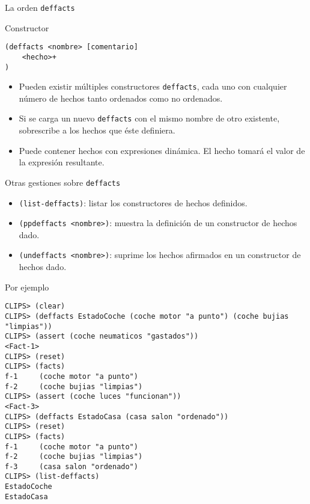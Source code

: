 \documentclass[usenames,dvipsnames,aspectratio=169]{beamer}
\begin{document}
\begin{frame}[fragile]{La orden \texttt{deffacts}}
	\begin{block}{Constructor}
		\begin{verbatim}
(deffacts <nombre> [comentario]
    <hecho>+
)
		\end{verbatim}
	\end{block}
	\begin{itemize}
		\item Pueden existir múltiples constructores \texttt{deffacts}, cada uno con cualquier número de hechos tanto ordenados como no ordenados.
		\item Si se carga un nuevo \texttt{deffacts} con el mismo nombre de otro existente, sobrescribe a los hechos que éste definiera.
		\item Puede contener hechos con expresiones dinámica. El hecho tomará el valor de la expresión resultante.
	\end{itemize}
\end{frame}

\begin{frame}{Otras gestiones sobre \texttt{deffacts}}
	\begin{itemize}
		\item \texttt{(list-deffacts)}: listar los constructores de hechos definidos.
		\item \texttt{(ppdeffacts <nombre>)}: muestra la definición de un constructor de hechos dado.
		\item \texttt{(undeffacts <nombre>)}: suprime los hechos afirmados en un constructor de hechos dado.
	\end{itemize}
\end{frame}

\begin{frame}[fragile]{Por ejemplo}
	\footnotesize
	\begin{verbatim}
CLIPS> (clear)
CLIPS> (deffacts EstadoCoche (coche motor "a punto") (coche bujias "limpias"))
CLIPS> (assert (coche neumaticos "gastados"))
<Fact-1>
CLIPS> (reset)
CLIPS> (facts)
f-1     (coche motor "a punto")
f-2     (coche bujias "limpias")
CLIPS> (assert (coche luces "funcionan"))
<Fact-3>
CLIPS> (deffacts EstadoCasa (casa salon "ordenado"))
CLIPS> (reset)
CLIPS> (facts)
f-1     (coche motor "a punto")
f-2     (coche bujias "limpias")
f-3     (casa salon "ordenado")
CLIPS> (list-deffacts)
EstadoCoche
EstadoCasa
	\end{verbatim}
\end{frame}

\begin{frame}
\titlepage
\end{frame}
\end{document}
